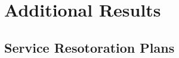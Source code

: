 \chapter{Additional Results}
\label{appx-a:additional-results}


\section{Service Resotoration Plans}






